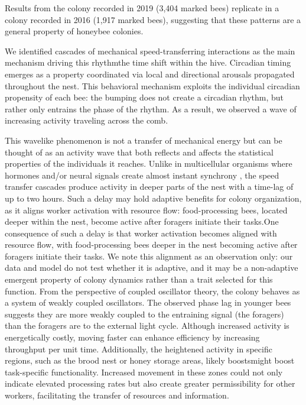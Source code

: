 \documentclass{article}
\newcommand{\added}[1]{{\color{blue}#1}}
\newcommand{\deleted}[1]{{\color{red}#1}} %
\newcommand{\replaced}[2]{\deleted{#1}\added{#2}}
\newcommand{\added}[1]{#1}
\newcommand{\deleted}[1]{}
\newcommand{\replaced}[2]{#2}
\begin{document}
\added{Results from the colony recorded in 2019 (3{,}404 marked bees) replicate in a colony recorded in 2016 (1{,}917 marked bees), suggesting that these patterns are a general property of honeybee colonies.}

We identified cascades of mechanical speed-transferring interactions as the main mechanism driving \replaced{this rhythm}{the time shift within the hive}. Circadian timing emerges as a property coordinated via local \added{and directional} arousals propagated throughout the nest. This behavioral mechanism exploits the individual circadian propensity of each bee: the bumping does not create a circadian rhythm, but rather only entrains the phase of the rhythm. As a result, we observed a wave of increasing activity traveling across the comb. 

This wavelike phenomenon is not a transfer of mechanical energy but can be thought of as an activity wave that both reflects and affects the statistical properties of the individuals it reaches. Unlike in multicellular organisms where hormones and/or neural signals create almost instant synchrony \cite{finger_coupled_2020}, the speed transfer cascades produce activity in deeper parts of the nest with a time-lag of up to two hours. \replaced{Such a delay may hold adaptive benefits for colony organization, as it aligns worker activation with resource flow: food-processing bees, located deeper within the nest, become active after foragers initiate their tasks.}{One consequence of such a delay is that worker activation becomes aligned with resource flow, with food-processing bees deeper in the nest becoming active after foragers initiate their tasks. We note this alignment as an observation only: our data and model do not test whether it is adaptive, and it may be a non-adaptive emergent property of colony dynamics rather than a trait selected for this function.} \added{From the perspective of coupled oscillator theory, the colony behaves as a system of weakly coupled oscillators. The observed phase lag in younger bees suggests they are more weakly coupled to the entraining signal (the foragers) than the foragers are to the external light cycle.}
Although increased activity is energetically costly, moving faster can enhance efficiency by increasing throughput per unit time. Additionally, the heightened activity in specific regions, such as the brood nest or honey storage areas, \replaced{likely boosts}{might boost} task-specific functionality. Increased movement in these zones could not only indicate elevated processing rates but also create greater permissibility for other workers, facilitating the transfer of resources and information.
\end{document}
